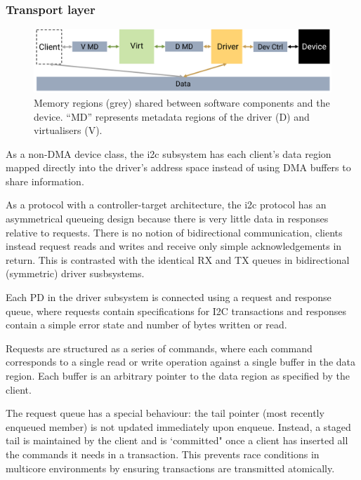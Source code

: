 \documentclass[a4paper,12pt]{report}
\newcommand{\figscale}{0.2}
\begin{document}
\subsubsection{Transport layer}

\begin{figure}[th]
  \centering
  \includegraphics[scale=\figscale]{i2c}
  \caption[Memory regions shared between software components
    and the device.]{Memory regions (grey) shared between software components
    and the device. ``MD'' represents metadata regions of the driver (D) and virtualisers (V).}
  \label{f:i2c_diagram}
\end{figure}


As a non-DMA device class, the \gls{i2c} subsystem has each client's
data region mapped directly into the driver's address space instead
of using DMA buffers to share information.

As a protocol with a controller-target architecture, the \gls{i2c} protocol
has an asymmetrical queueing design because there is very little data in
responses relative to requests. There is no notion of bidirectional communication,
clients instead request reads and writes and receive only simple acknowledgements
in return. This is contrasted with the identical RX and TX queues in bidirectional
(symmetric) driver susbsystems.

Each PD in the driver subsystem is connected
using a request and response queue, where requests contain
specifications for I2C transactions and responses contain a simple error state
and number of bytes written or read.

Requests are structured as a series of commands, where each command corresponds
to a single read or write operation against a single buffer in the data region.
Each buffer is an arbitrary pointer to the data region as specified by the client.

The request queue has a special behaviour: the tail pointer (most recently enqueued
member) is not updated immediately upon enqueue. Instead, a staged tail is maintained
by the client and is `committed" once a client has inserted all the commands it needs
in a transaction. This prevents race conditions in multicore environments by ensuring
transactions are transmitted atomically.
\end{document}
